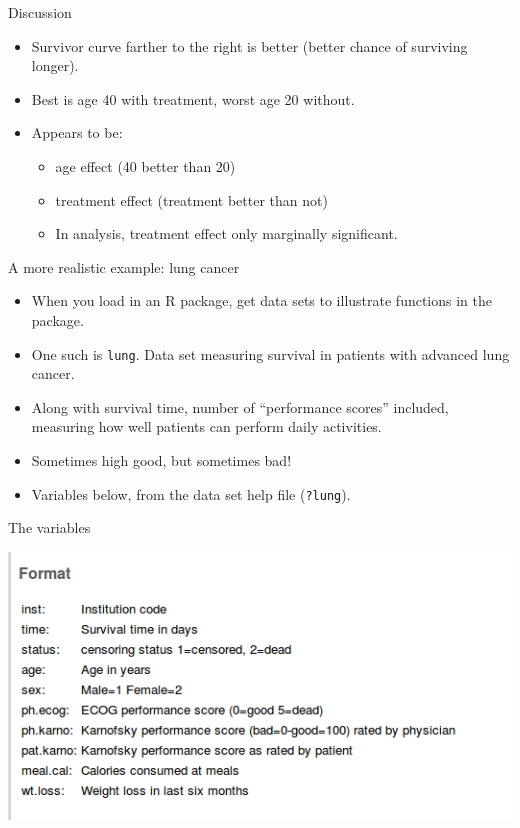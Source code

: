 \documentclass[
  ignorenonframetext,
]{beamer}
\begin{document}
\begin{frame}{Discussion}
\protect\hypertarget{discussion}{}

\begin{itemize}
\item
  Survivor curve farther to the right is better (better chance of
  surviving longer).
\item
  Best is age 40 with treatment, worst age 20 without.
\item
  Appears to be:

  \begin{itemize}
  \item
    age effect (40 better than 20)
  \item
    treatment effect (treatment better than not)
  \item
    In analysis, treatment effect only marginally significant.
  \end{itemize}
\end{itemize}

\end{frame}

\begin{frame}[fragile]{A more realistic example: lung cancer}
\protect\hypertarget{a-more-realistic-example-lung-cancer}{}

\begin{itemize}
\item
  When you load in an R package, get data sets to illustrate functions
  in the package.
\item
  One such is \texttt{lung}. Data set measuring survival in patients
  with advanced lung cancer.
\item
  Along with survival time, number of ``performance scores'' included,
  measuring how well patients can perform daily activities.
\item
  Sometimes high good, but sometimes bad!
\item
  Variables below, from the data set help file (\texttt{?lung}).
\end{itemize}

\end{frame}

\begin{frame}{The variables}
\protect\hypertarget{the-variables}{}

\includegraphics{lung-cancer-data.png}

\end{frame}
\end{document}
